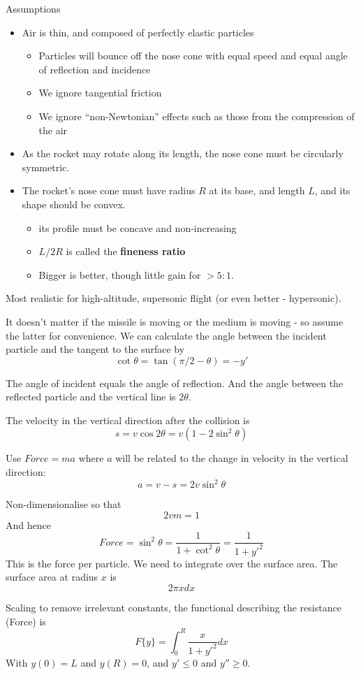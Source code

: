 \documentclass{E:/Documents/Latex/myassignment}
\begin{document}
Assumptions
\begin{itemize}
	\item Air is thin, and composed of perfectly elastic particles
\begin{itemize}	
	\item Particles will bounce off the nose cone with equal speed and equal angle of reflection and incidence
	\item We ignore tangential friction
	\item We ignore ``non-Newtonian'' effects such as those from the compression of the air
\end{itemize}
	\item As the rocket may rotate along its length, the nose cone must be circularly symmetric.
	\item The rocket's nose cone must have radius $R$ at its base, and length $L$, and its shape should be convex.
	\begin{itemize}
		\item its profile must be concave and non-increasing
		\item $L/2R$ is called the \textbf{fineness ratio}
		\item Bigger is better, though little gain for $> 5:1$.
	\end{itemize}
\end{itemize}
Most realistic for high-altitude, supersonic flight (or even better - hypersonic).

It doesn't matter if the missile is moving or the medium is moving - so assume the latter for convenience. We can calculate the angle between the incident particle and the tangent to the surface by
\[\cot\theta = \tan(\pi/2 - \theta) = -y'\]

The angle of incident equals the angle of reflection. And the angle between the reflected particle and the vertical line is $2\theta$.

The velocity in the vertical direction after the collision is
\[s = v\cos 2\theta = v(1- 2 \sin^2\theta)\]

Use $Force = ma$ where $a$ will be related to the change in velocity in the vertical direction:
\[a = v-s = 2v\sin^2\theta\]

Non-dimensionalise so that
\[2vm = 1\]
And hence
\[Force = \sin^2\theta = \frac{1}{1+\cot^2\theta} = \frac{1}{1+y'^2}\]
This is the force per particle. We need to integrate over the surface area.
The surface area at radius $x$ is 
\[2\pi x dx\]

Scaling to remove irrelevant constants, the functional describing the resistance (Force)
is
\[F\{y\} = \int_0^R \frac{x}{1+y'^2} dx\]
With $y(0) = L$ and $y(R) = 0$, and $y' \leq 0$ and $y'' \geq 0$.
\end{document}
